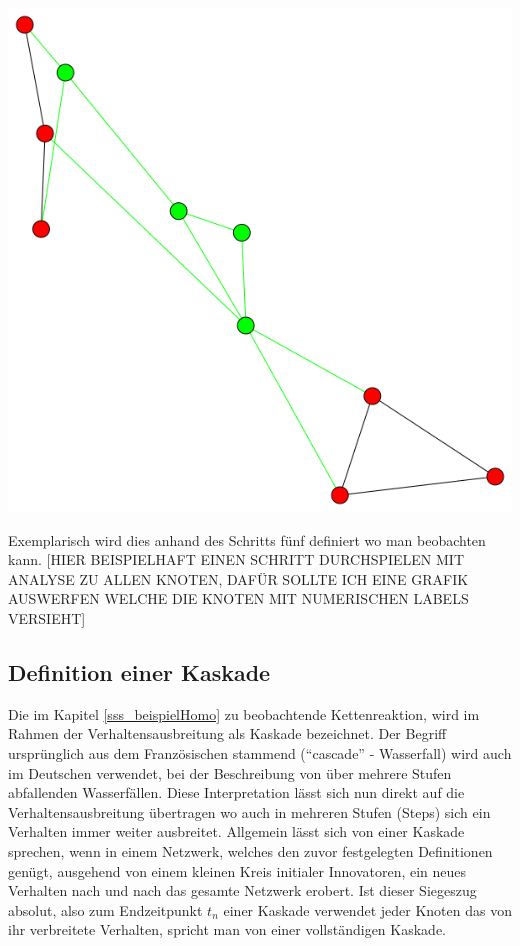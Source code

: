 \documentclass[12pt]{article}
\begin{document}
\begin{minipage}[t]{0.3\textwidth}
\includegraphics[width=\textwidth]{cascadeHomo/cascade1.png}
\end{minipage}

Exemplarisch wird dies anhand des Schritts fünf definiert wo man beobachten kann. [HIER BEISPIELHAFT EINEN SCHRITT DURCHSPIELEN MIT ANALYSE ZU ALLEN KNOTEN, DAFÜR SOLLTE ICH EINE GRAFIK AUSWERFEN WELCHE DIE KNOTEN MIT NUMERISCHEN LABELS VERSIEHT]

\subsection{Definition einer Kaskade}
Die im Kapitel \ref{sss_beispielHomo} zu beobachtende Kettenreaktion, wird im Rahmen der Verhaltensausbreitung als Kaskade bezeichnet. Der Begriff ursprünglich aus dem Französischen stammend ("`cascade"' - Wasserfall) wird auch im Deutschen verwendet, bei der Beschreibung von über mehrere Stufen abfallenden Wasserfällen. Diese Interpretation lässt sich nun direkt auf die Verhaltensausbreitung übertragen wo auch in mehreren Stufen (Steps) sich ein Verhalten immer weiter ausbreitet. Allgemein lässt sich von einer Kaskade sprechen, wenn in einem Netzwerk, welches den zuvor festgelegten Definitionen genügt, ausgehend von einem kleinen Kreis initialer Innovatoren, ein neues Verhalten nach und nach das gesamte Netzwerk erobert. Ist dieser Siegeszug absolut, also zum Endzeitpunkt $t_n$ einer Kaskade verwendet jeder Knoten das von ihr verbreitete Verhalten, spricht man von einer vollständigen Kaskade.
\end{document}
